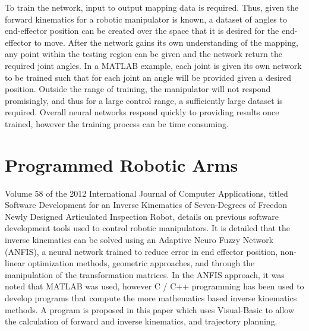 \documentclass[12pt,openany,a4paper]{book}
\begin{document}
To train the network, input to output mapping data is required. Thus, given the forward kinematics for a robotic manipulator is known, a dataset of angles to end-effector position can be created over the space that it is desired for the end-effector to move. After the network gains its own understanding of the mapping, any point within the testing region can be given and the network return the required joint angles. In a MATLAB example, each joint is given its own network to be trained such that for each joint an angle will be provided given a desired position. Outside the range of training, the manipulator will not respond promisingly, and thus for a large control range, a sufficiently large dataset is required. Overall neural networks respond quickly to providing results once trained, however the training process can be time consuming.

\section{Programmed Robotic Arms}
Volume 58 of the 2012 International Journal of Computer Applications, titled Software Development for an Inverse Kinematics of Seven-Degrees of Freedon Newly Designed Articulated Inspection Robot, details on previous software development tools used to control robotic manipulators. It is detailed that the inverse kinematics can be solved using an Adaptive Neuro Fuzzy Network (ANFIS), a neural network trained to reduce error in end effector position, non-linear optimization methods, geometric approaches, and through the manipulation of the transformation matrices. In the ANFIS approach, it was noted that MATLAB was used, however C / C++ programming has been used to develop programs that compute the more mathematics based inverse kinematics methods. A program is proposed in this paper which uses Visual-Basic to allow the calculation of forward and inverse kinematics, and trajectory planning.\\
\end{document}
